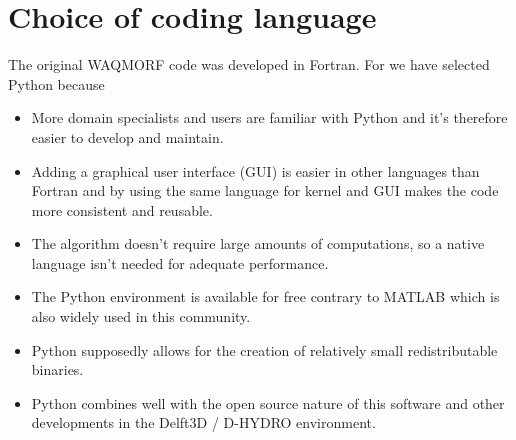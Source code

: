 \section{Choice of coding language}

The original WAQMORF code was developed in Fortran.
For \dfastmi we have selected Python because

\begin{itemize}
\item More domain specialists and users are familiar with Python and it's therefore easier to develop and maintain.
\item Adding a graphical user interface (GUI) is easier in other languages than Fortran and by using the same language for kernel and GUI makes the code more consistent and reusable.
\item The algorithm doesn't require large amounts of computations, so a native language isn't needed for adequate performance.
\item The Python environment is available for free contrary to MATLAB which is also widely used in this community.
\item Python supposedly allows for the creation of relatively small redistributable binaries.
\item Python combines well with the open source nature of this software and other developments in the Delft3D / D-HYDRO environment.
\end{itemize}
